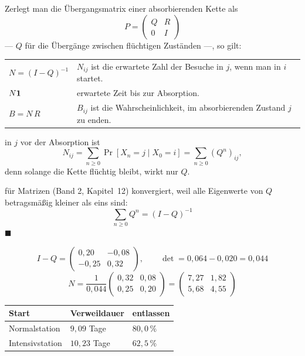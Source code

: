 \begin{merksatz}
Zerlegt man die Übergangsmatrix einer absorbierenden Kette als
\[ P = \begin{pmatrix} Q & R\\ 0 & I \end{pmatrix} \]
--- $Q$ für die Übergänge zwischen flüchtigen Zuständen ---, so gilt:

\begin{center}
{\small
\renewcommand{\arraystretch}{1.55}
\begin{tabular}{@{}P{2.8cm}P{5.8cm}@{}}
\toprule
$N = (I-Q)^{-1}$ & $N_{ij}$ ist die erwartete Zahl der Besuche in $j$, wenn man in $i$ startet.\\
$N\boldsymbol{1}$ & erwartete Zeit bis zur Absorption.\\
$B = N\,R$ & $B_{ij}$ ist die Wahrscheinlichkeit, im absorbierenden Zustand $j$ zu enden.\\
\bottomrule
\end{tabular}}
\end{center}

 in $j$ vor der Absorption ist
\[ N_{ij} = \sum_{n\ge0} \Pr[X_n = j \mid X_0 = i] = \sum_{n\ge0} (Q^{n})_{ij} , \]
denn solange die Kette flüchtig bleibt, wirkt nur $Q$.

 für Matrizen (Band 2, Kapitel~12) konvergiert, weil alle Eigenwerte von $Q$ betragsmäßig kleiner als eins sind:
\[ \sum_{n\ge0} Q^{n} = (I-Q)^{-1} \]
$\blacksquare$

\[ I - Q = \begin{pmatrix} 0{,}20 & -0{,}08\\ -0{,}25 & 0{,}32\end{pmatrix}, \qquad \det = 0{,}064 - 0{,}020 = 0{,}044 \]
\[ N = \frac{1}{0{,}044}\begin{pmatrix} 0{,}32 & 0{,}08\\ 0{,}25 & 0{,}20\end{pmatrix} = \begin{pmatrix} 7{,}27 & 1{,}82\\ 5{,}68 & 4{,}55\end{pmatrix} \]

\begin{center}
{\small
\renewcommand{\arraystretch}{1.5}
\begin{tabular}{@{}P{2.8cm}P{2.4cm}P{2.4cm}@{}}
\toprule
\textbf{Start} & \textbf{Verweildauer} & \textbf{entlassen}\\
\midrule
Normalstation & $9{,}09$ Tage & $80{,}0\,\%$\\
Intensivstation & $10{,}23$ Tage & $62{,}5\,\%$\\
\bottomrule
\end{tabular}}
\end{center}


\end{merksatz}
